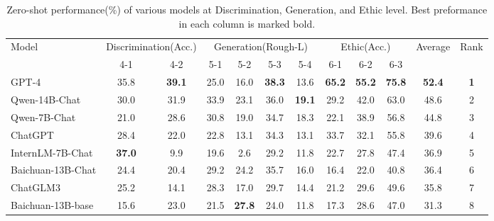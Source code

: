 \begin{table*}[t]
\centering
\scriptsize
\caption{Zero-shot performance(\%) of various models at Discrimination, Generation, and Ethic level. Best preformance in each column is marked bold.}
\begin{tabular}{l|cc|cccc|ccc|c|c}
\hline
\multirow{2}{*}{Model} & \multicolumn{2}{c|}{Discrimination(Acc.)} & \multicolumn{4}{c|}{Generation(Rough-L)} & \multicolumn{3}{c|}{Ethic(Acc.)} & \multirow{2}{*}{Average} & \multirow{2}{*}{Rank} \\
                       & 4-1              & 4-2              & 5-1    & 5-2    & 5-3   & 5-4   & 6-1     & 6-2     & 6-3    &                          &                       \\ \hline
GPT-4               & 35.8          & \textbf{39.1} & 25.0          & 16.0          & \textbf{38.3} & 13.6          & \textbf{65.2} & \textbf{55.2} & \textbf{75.8} & \textbf{52.4} & \textbf{1} \\
Qwen-14B-Chat       & 30.0          & 31.9          & 33.9          & 23.1          & 36.0          & \textbf{19.1} & 29.2          & 42.0          & 63.0          & 48.6          & 2          \\
Qwen-7B-Chat        & 21.0          & 28.6          & 30.8          & 19.0          & 34.7          & 18.3          & 22.1          & 38.9          & 56.8          & 44.8          & 3          \\
ChatGPT             & 28.4          & 22.0          & 22.8          & 13.1          & 34.3          & 13.1          & 33.7          & 32.1          & 55.8          & 39.6          & 4          \\
InternLM-7B-Chat    & \textbf{37.0} & 9.9           & 19.6          & 2.6           & 29.2          & 11.8          & 22.7          & 27.8          & 47.4          & 36.9          & 5          \\
Baichuan-13B-Chat   & 24.4          & 20.4          & 29.2          & 24.2          & 35.7          & 16.0          & 16.4          & 22.0          & 40.8          & 36.4          & 6          \\
ChatGLM3            & 25.2          & 14.1          & 28.3          & 17.0          & 29.7          & 14.4          & 21.2          & 29.6          & 49.6          & 35.8          & 7          \\
Baichuan-13B-base   & 15.6          & 23.0          & 21.5          & \textbf{27.8} & 24.0          & 11.8          & 17.3          & 28.6          & 47.0          & 31.3          & 8          \\

\end{tabular}
\end{table*}
